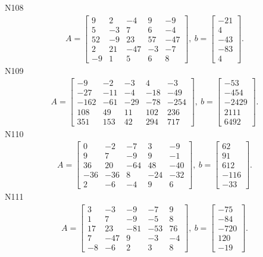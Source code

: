 \documentclass[11pt]{report}
\begin{document}
N108
\begin{align*}
 A = \left[\begin{matrix}9 & 2 & -4 & 9 & -9\\5 & -3 & 7 & 6 & -4\\52 & -9 & 23 & 57 & -47\\2 & 21 & -47 & -3 & -7\\-9 & 1 & 5 & 6 & 8\end{matrix}\right],
\ b = \left[\begin{matrix}-21\\4\\-43\\-83\\4\end{matrix}\right]. 
 \end{align*}
N109
\begin{align*}
 A = \left[\begin{matrix}-9 & -2 & -3 & 4 & -3\\-27 & -11 & -4 & -18 & -49\\-162 & -61 & -29 & -78 & -254\\108 & 49 & 11 & 102 & 236\\351 & 153 & 42 & 294 & 717\end{matrix}\right],
\ b = \left[\begin{matrix}-53\\-454\\-2429\\2111\\6492\end{matrix}\right]. 
 \end{align*}
N110
\begin{align*}
 A = \left[\begin{matrix}0 & -2 & -7 & 3 & -9\\9 & 7 & -9 & 9 & -1\\36 & 20 & -64 & 48 & -40\\-36 & -36 & 8 & -24 & -32\\2 & -6 & -4 & 9 & 6\end{matrix}\right],
\ b = \left[\begin{matrix}62\\91\\612\\-116\\-33\end{matrix}\right]. 
 \end{align*}
N111
\begin{align*}
 A = \left[\begin{matrix}3 & -3 & -9 & -7 & 9\\1 & 7 & -9 & -5 & 8\\17 & 23 & -81 & -53 & 76\\7 & -47 & 9 & -3 & -4\\-8 & -6 & 2 & 3 & 8\end{matrix}\right],
\ b = \left[\begin{matrix}-75\\-84\\-720\\120\\-19\end{matrix}\right]. 
 \end{align*}
\end{document}
